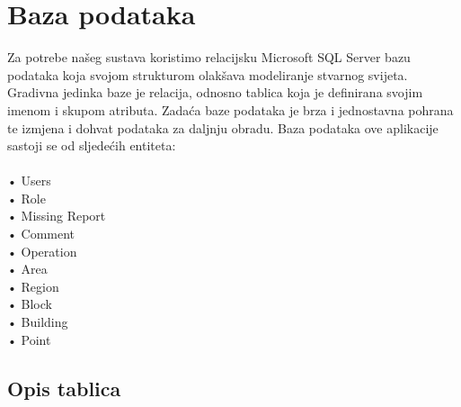                                  

			
		\section{Baza podataka}

             Za potrebe našeg sustava koristimo relacijsku Microsoft SQL Server bazu podataka koja svojom strukturom olakšava modeliranje stvarnog svijeta. Gradivna jedinka baze je relacija, odnosno tablica koja je definirana svojim imenom i skupom atributa. Zadaća baze podataka je brza i jednostavna pohrana te izmjena i dohvat podataka za daljnju obradu.
        Baza podataka ove aplikacije sastoji se od sljedećih entiteta: \\
        \\
        \-\hspace{1cm} • Users \\
        \-\hspace{1cm} • Role \\
        \-\hspace{1cm} • Missing Report \\
        \-\hspace{1cm} • Comment \\
        \-\hspace{1cm} • Operation \\
        \-\hspace{1cm} • Area \\
        \-\hspace{1cm} • Region \\
        \-\hspace{1cm} • Block \\
        \-\hspace{1cm} • Building \\
        \-\hspace{1cm} • Point \\
			

			\subsection{Opis tablica}

